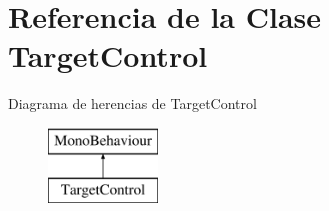 \hypertarget{class_target_control}{}\section{Referencia de la Clase Target\+Control}
\label{class_target_control}
Diagrama de herencias de Target\+Control\begin{figure}[H]
\begin{center}
\leavevmode
\includegraphics[height=2.000000cm]{class_target_control}
\end{center}
\end{figure}
